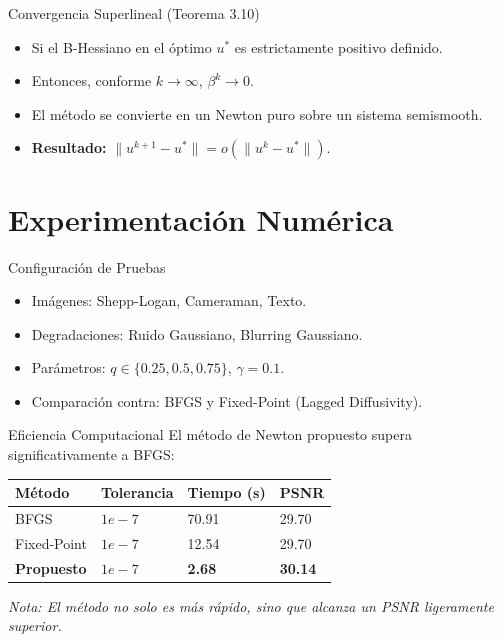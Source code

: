 \documentclass[10pt, aspectratio=169, xcolor={dvipsnames}]{beamer}
\begin{document}
\begin{frame}{Convergencia Superlineal (Teorema 3.10)}
    \begin{itemize}
        \item Si el B-Hessiano en el óptimo $u^*$ es estrictamente positivo definido.
        \item Entonces, conforme $k \to \infty$, $\beta^k \to 0$.
        \item El método se convierte en un Newton puro sobre un sistema semismooth.
        \item \textbf{Resultado:} $\|u^{k+1} - u^*\| = o(\|u^k - u^*\|)$.
    \end{itemize}
\end{frame}

\section{Experimentación Numérica}

\begin{frame}{Configuración de Pruebas}
    \begin{itemize}
        \item Imágenes: Shepp-Logan, Cameraman, Texto.
        \item Degradaciones: Ruido Gaussiano, Blurring Gaussiano.
        \item Parámetros: $q \in \{0.25, 0.5, 0.75\}$, $\gamma = 0.1$.
        \item Comparación contra: BFGS y Fixed-Point (Lagged Diffusivity).
    \end{itemize}
\end{frame}

\begin{frame}{Eficiencia Computacional}
    El método de Newton propuesto supera significativamente a BFGS:
    \begin{table}[]
        \begin{tabular}{@{}llll@{}}
        \toprule
        Método       & Tolerancia & Tiempo (s) & PSNR  \\ \bottomrule
        BFGS         & $1e-7$     & 70.91      & 29.70 \\
        Fixed-Point  & $1e-7$     & 12.54      & 29.70 \\
        \textbf{Propuesto} & \textbf{$1e-7$} & \textbf{2.68} & \textbf{30.14} \\ \bottomrule
        \end{tabular}
    \end{table}
    \textit{Nota: El método no solo es más rápido, sino que alcanza un PSNR ligeramente superior.}
\end{frame}
\end{document}
